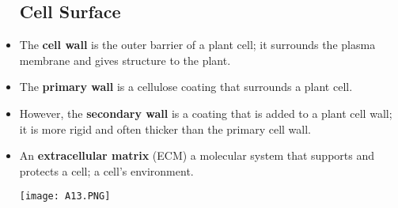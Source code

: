 \documentclass[letterpaper]{article}
\begin{document}
\begin{itemize}
    \subsection{Cell Surface}
    \item The \textbf{cell wall} is the outer barrier of a plant cell; it surrounds the plasma membrane and gives structure to the plant.
    \item The \textbf{primary wall} is a cellulose coating that surrounds a plant cell.
    \item However, the \textbf{secondary wall} is a coating that is added to a plant cell wall; it is more rigid and often thicker than the primary cell wall.
    \item An \textbf{extracellular matrix} (ECM) a molecular system that supports and protects a cell; a cell’s environment.
    \begin{center}\texttt{[image: A13.PNG]}\end{center}
\end{itemize}

\newpage
\end{document}
